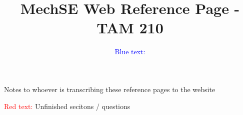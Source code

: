 \documentclass{article}
\title{MechSE Web Reference Page - TAM 210}
\newcommand{\red}[1]{\textcolor{red}{#1}}
\newcommand{\blue}[1]{\textcolor{blue}{#1}}
\begin{document}
\maketitle
\date


\blue{Blue text:} Notes to whoever is transcribing these reference pages to the website

\red{Red text:} Unfinished secitons / questions

\tableofcontents

\newpage















\end{document}
